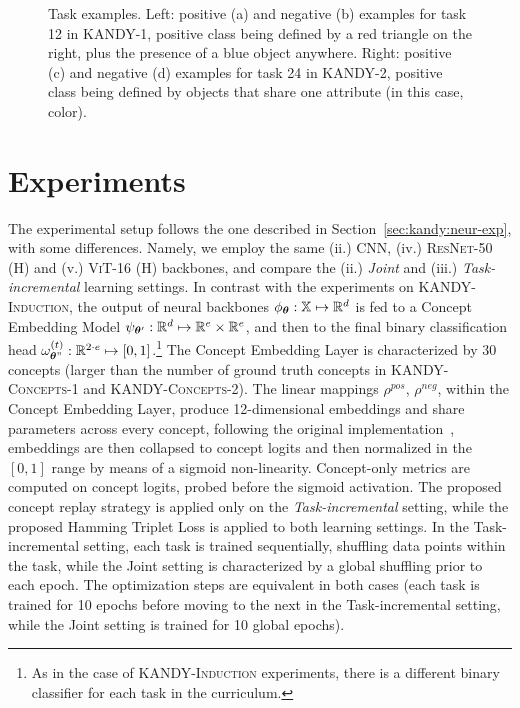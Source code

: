 \begin{figure}
\begin{subfigure}{.21\textwidth}
\caption{}%
\end{subfigure}
\caption[Examples from KANDY]{Task examples. Left: positive (a) and negative (b) examples for task 12 in KANDY-1, positive class being defined by a red triangle on the right, plus the presence of a blue object anywhere. Right: positive (c) and negative (d) examples for task 24 in KANDY-2, positive class being defined by objects that share one attribute (in this case, color).
}
\label{cem:fig:kandy-examples}
\end{figure}


\section{Experiments}\label{cem:sec:experiments}
The experimental setup follows the one described in Section~\ref{sec:kandy:neur-exp}, with some differences. Namely, we employ the same (ii.) \textsc{CNN}, (iv.) \textsc{ResNet-50 (H)} and (v.) \textsc{ViT-16 (H)} backbones, and compare the (ii.) \textit{Joint} and (iii.) \textit{Task-incremental} learning settings.
In contrast with the experiments on \textsc{KANDY-Induction}, the output of neural backbones $\phi_{\bm{\theta}}: {\mathbb{X}} \mapsto \mathbb{R}^d$ is fed to a Concept Embedding Model $\psi_{{\bm{\theta}}'}: \mathbb{R}^d \mapsto \mathbb{R}^e \times \mathbb{R}^e$, and then to the final binary classification head $\omega^{(t)}_{{\bm{\theta}}"}: \mathbb{R}^{2\cdot e} \mapsto [0, 1]$.\footnote{As in the case of \textsc{KANDY-Induction} experiments, there is a different binary classifier for each task in the curriculum.}
The Concept Embedding Layer is characterized by 30 concepts (larger than the number of ground truth concepts in \textsc{KANDY-Concepts-1} and \textsc{KANDY-Concepts-2}). The linear mappings $\rho^{pos}$, $\rho^{neg}$, within the Concept Embedding Layer, produce 12-dimensional embeddings and share parameters across every concept, following the original implementation~\cite{espinosa2022concept}, embeddings are then collapsed to concept logits and then normalized in the $[0, 1]$ range by means of a sigmoid non-linearity.
Concept-only metrics are computed on concept logits, probed before the sigmoid activation.
The proposed concept replay strategy is applied only on the \textit{Task-incremental} setting, while the proposed Hamming Triplet Loss is applied to both learning settings.
In the Task-incremental setting, each task is trained sequentially, shuffling data points within the task, while the Joint setting is characterized by a global shuffling prior to each epoch. The optimization steps are equivalent in both cases (each task is trained for 10 epochs before moving to the next in the Task-incremental setting, while the Joint setting is trained for 10 global epochs).



